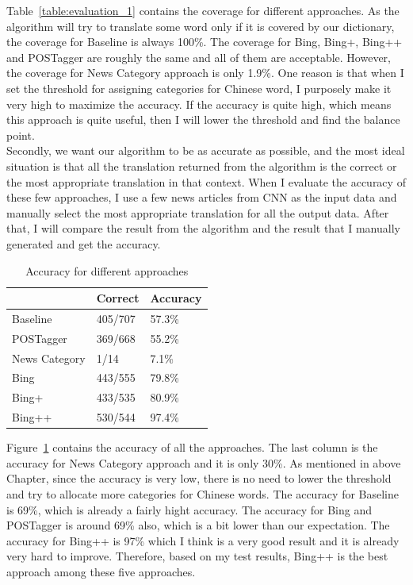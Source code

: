 Table~\ref{table:evaluation_1} contains the coverage for different approaches. As the algorithm will try to translate some word only if it is covered by our dictionary, the coverage for Baseline is always 100\%. The coverage for Bing, Bing+, Bing++ and POSTagger are roughly the same and all of them are acceptable. However, the coverage for News Category approach is only 1.9\%. One reason is that when I set the threshold for assigning categories for Chinese word, I purposely make it very high to maximize the accuracy. If the accuracy is quite high, which means this approach is quite useful, then I will lower the threshold and find the balance point.
\\
Secondly, we want our algorithm to be as accurate as possible, and the most ideal situation is that all the translation returned from the algorithm is the correct or the most appropriate translation in that context. When I evaluate the accuracy of these few approaches, I use a few news articles from CNN as the input data and manually select the most appropriate translation for all the output data. After that, I will compare the result from the algorithm and the result that I manually generated and get the accuracy.

\begin{table}[ht]
  \caption{Accuracy for different approaches}
  \label{table:evaluation_3}
  \begin{tabular}{| p{2cm} | p{2cm} | p{2cm} |}
    \hline
     & Correct & Accuracy\\
    \hline
    Baseline & 405/707 & 57.3\%\\
    \hline
    POSTagger & 369/668 & 55.2\%\\
    \hline
    News Category & 1/14 & 7.1\%\\
    \hline
    Bing & 443/555 & 79.8\%\\
    \hline
    Bing+ & 433/535 & 80.9\%\\
    \hline
    Bing++ & 530/544 & 97.4\%\\
    \hline
  \end{tabular}
\end{table}

Figure~\ref{table:evaluation_3} contains the accuracy of all the approaches. The last column is the accuracy for News Category approach and it is only 30\%. As mentioned in above Chapter, since the accuracy is very low, there is no need to lower the threshold and try to allocate more categories for Chinese words. The accuracy for Baseline is 69\%, which is already a fairly hight accuracy. The accuracy for Bing and POSTagger is around 69\% also, which is a bit lower than our expectation. The accuracy for Bing++ is 97\% which I think is a very good result and it is already very hard to improve. Therefore, based on my test results, Bing++ is the best approach among these five approaches.
